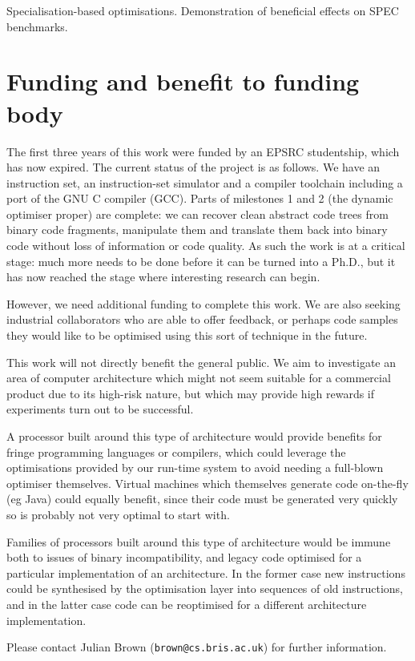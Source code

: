 \documentclass[11pt,letterpaper,onecolumn,notitlepage]{article}
\begin{document}
Specialisation-based optimisations. Demonstration of beneficial effects on SPEC benchmarks.

\section{Funding and benefit to funding body}

The first three years of this work were funded by an EPSRC studentship, which has now expired. The current status of the project is as follows. We have an instruction set, an instruction-set simulator and a compiler toolchain including a port of the GNU C compiler (GCC). Parts of milestones 1 and 2 (the dynamic optimiser proper) are complete: we can recover clean abstract code trees from binary code fragments, manipulate them and translate them back into binary code without loss of information or code quality. As such the work is at a critical stage: much more needs to be done before it can be turned into a Ph.D., but it has now reached the stage where interesting research can begin.

However, we need additional funding to complete this work. We are also seeking industrial collaborators who are able to offer feedback, or perhaps code samples they would like to be optimised using this sort of technique in the future.

This work will not directly benefit the general public. We aim to investigate an area of computer architecture which might not seem suitable for a commercial product due to its high-risk nature, but which may provide high rewards if experiments turn out to be successful.

A processor built around this type of architecture would provide benefits for fringe programming languages or compilers, which could leverage the optimisations provided by our run-time system to avoid needing a full-blown optimiser themselves. Virtual machines which themselves generate code on-the-fly (eg Java) could equally benefit, since their code must be generated very quickly so is probably not very optimal to start with.

Families of processors built around this type of architecture would be immune both to issues of binary incompatibility, and legacy code optimised for a particular implementation of an architecture. In the former case new instructions could be synthesised by the optimisation layer into sequences of old instructions, and in the latter case code can be reoptimised for a different architecture implementation.

Please contact Julian Brown ({\tt brown@cs.bris.ac.uk}) for further information.





\end{document}
